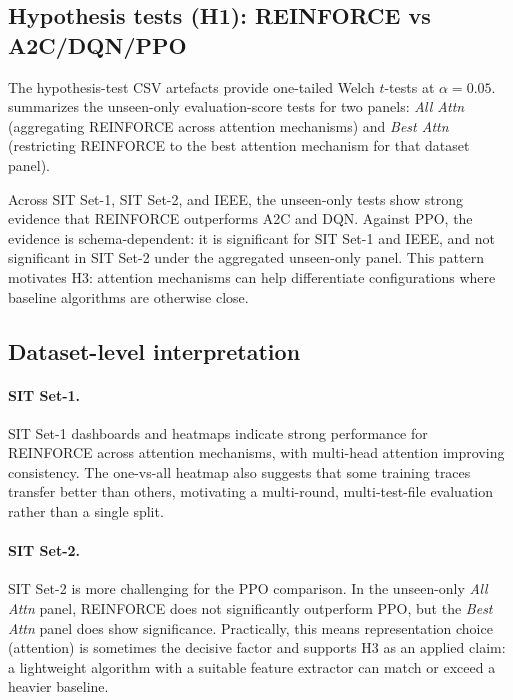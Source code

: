 \documentclass[11pt]{article}
\newcommand{\autorlTableRoot}{tables}
\renewcommand{\autorlTableRoot}{paper/tables}%
\begin{document}
\subsection{Hypothesis tests (H1): REINFORCE vs A2C/DQN/PPO}
\label{sec:hypothesis_tests}
The hypothesis-test CSV artefacts provide one-tailed Welch $t$-tests at $\alpha=0.05$.  summarizes the unseen-only evaluation-score tests for two panels: \emph{All Attn} (aggregating REINFORCE across attention mechanisms) and \emph{Best Attn} (restricting REINFORCE to the best attention mechanism for that dataset panel).

\begin{table}[t]
	\centering
	\caption{Hypothesis tests for H1 (unseen-only evaluation score): one-tailed Welch $t$-tests comparing REINFORCE to each competitor at $\alpha=0.05$.}
	\label{tab:hyp_tests}
	
\end{table}

Across SIT Set-1, SIT Set-2, and IEEE, the unseen-only tests show strong evidence that REINFORCE outperforms A2C and DQN. Against PPO, the evidence is schema-dependent: it is significant for SIT Set-1 and IEEE, and not significant in SIT Set-2 under the aggregated unseen-only panel. This pattern motivates H3: attention mechanisms can help differentiate configurations where baseline algorithms are otherwise close.

\subsection{Dataset-level interpretation}
\label{sec:dataset_interpretation}
\paragraph{SIT Set-1.}
SIT Set-1 dashboards and heatmaps indicate strong performance for REINFORCE across attention mechanisms, with multi-head attention improving consistency. The one-vs-all heatmap also suggests that some training traces transfer better than others, motivating a multi-round, multi-test-file evaluation rather than a single split.

\paragraph{SIT Set-2.}
SIT Set-2 is more challenging for the PPO comparison. In the unseen-only \emph{All Attn} panel, REINFORCE does not significantly outperform PPO, but the \emph{Best Attn} panel does show significance. Practically, this means representation choice (attention) is sometimes the decisive factor and supports H3 as an applied claim: a lightweight algorithm with a suitable feature extractor can match or exceed a heavier baseline.
\end{document}
